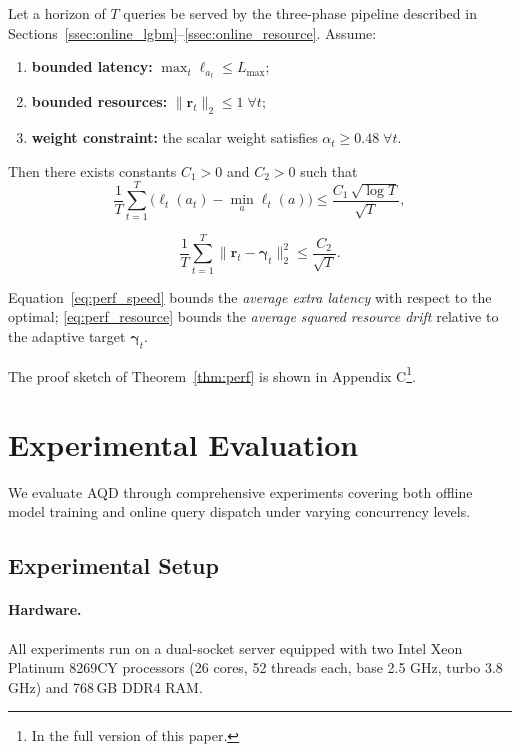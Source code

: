 \documentclass[sigconf, nonacm]{acmart}
\newcommand{\dispatcher}{AQD\xspace}
\begin{document}
\begin{theorem}[]
\label{thm:perf}
Let a horizon of \(T\) queries be served by the three-phase pipeline
described in
Sections~\ref{ssec:online_lgbm}–\ref{ssec:online_resource}.
Assume:
\begin{enumerate}
\item \textbf{bounded latency:} \(\max_{t}\ell_{a_t}\le L_{\max}\);
\item \textbf{bounded resources:} \(\|\mathbf r_t\|_2\le 1\;\forall t\);
\item \textbf{weight constraint:} the scalar weight satisfies
      \(\alpha_t\ge 0.48\;\forall t\).
\end{enumerate}
Then there exists constants \(C_1>0\) and \(C_2>0\) such that
\begin{equation}
    \frac1T\sum_{t=1}^{T}
  \bigl(\ell_{t}(a_t)-\min_{a}\ell_{t}(a)\bigr)
\le
  \frac{C_1\,\sqrt{\log T}}{\sqrt{T}},
   \label{eq:perf_speed}
\end{equation}


\begin{equation}
\frac{1}{T}\sum_{t=1}^{T}
  \bigl\|\mathbf{r}_t-\boldsymbol{\gamma}_t\bigr\|_2^{2}
\le
  \frac{C_2}{\sqrt{T}}.
\label{eq:perf_resource}
\end{equation}


Equation~\eqref{eq:perf_speed} bounds the \emph{average extra latency}
with respect to the optimal; \eqref{eq:perf_resource} bounds the
\emph{average squared resource drift} relative to the adaptive target
\(\boldsymbol\gamma_t\).
\end{theorem}

The proof sketch of Theorem~\ref{thm:perf} is shown in Appendix C\footnote{In the full version of this paper.}.



\section{Experimental Evaluation}
\label{sec:exp}

We evaluate \dispatcher through comprehensive experiments covering both offline model training and online query dispatch under varying concurrency levels.

\subsection{Experimental Setup}
\paragraph{Hardware.}
All experiments run on a dual-socket server equipped with two Intel\textsuperscript{\textregistered} Xeon Platinum 8269CY processors (26 cores, 52 threads each, base 2.5 GHz, turbo 3.8 GHz) and 768\,GB DDR4 RAM. %
\end{document}
